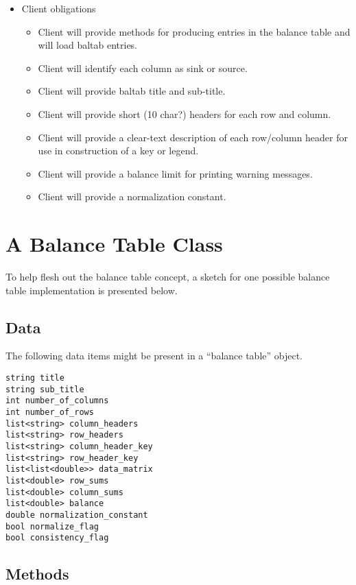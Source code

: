 \documentclass[reqno]{lanl}
\begin{document}
\begin{itemize}
\item Client obligations
\begin{itemize}
\item Client will provide methods for producing entries
      in the balance table and will load baltab entries.
\item Client will identify each column as sink or source.
\item Client will provide baltab title and sub-title.
\item Client will provide short (10 char?) headers for each row and column.
\item Client will provide a clear-text description of each row/column header
      for use in construction of a key or legend.
\item Client will provide a balance limit for printing warning
      messages.
\item Client will provide a normalization constant.
\end{itemize}


\end{itemize}



\section*{A Balance Table Class}

To help flesh out the balance table concept, a sketch
for one possible balance table implementation is presented
below.

\subsection*{Data} The following data items might be present
in a ``balance table'' object.
\begin{verbatim}
string title 
string sub_title
int number_of_columns
int number_of_rows
list<string> column_headers
list<string> row_headers
list<string> column_header_key
list<string> row_header_key
list<list<double>> data_matrix
list<double> row_sums
list<double> column_sums
list<double> balance
double normalization_constant
bool normalize_flag
bool consistency_flag
\end{verbatim}

\subsection*{Methods}
\end{document}
